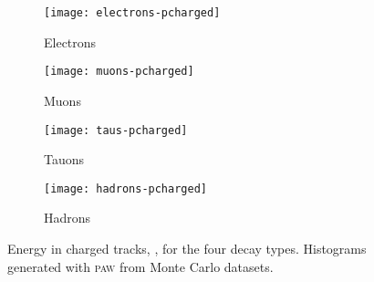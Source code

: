 \begin{figure}[h!]
    \centering
    \begin{subfigure}[c]{0.48\linewidth}
        \centering
        \texttt{[image: electrons-pcharged]}
        \caption{%
            Electrons
        }
        \label{fig:paw-pcharged/electrons}
    \end{subfigure}
    \hfill
    \begin{subfigure}[c]{0.48\linewidth}
        \centering
        \texttt{[image: muons-pcharged]}
        \caption{%
            Muons
        }
        \label{fig:paw-pcharged/muons}
    \end{subfigure}

    \vspace{2ex}

    \begin{subfigure}[c]{0.48\linewidth}
        \centering
        \texttt{[image: taus-pcharged]}
        \caption{%
            Tauons
        }
        \label{fig:paw-pcharged/tauons}
    \end{subfigure}
    \hfill
    \begin{subfigure}[c]{0.48\linewidth}
        \centering
        \texttt{[image: hadrons-pcharged]}
        \caption{%
            Hadrons
        }
        \label{fig:paw-pcharged/hadrons}
    \end{subfigure}
    \caption{%
        Energy in charged tracks, \pcharged, for the four decay types.
        Histograms generated with \textsc{paw} from Monte Carlo datasets.
    }
    \label{fig:paw-pcharged}
\end{figure}
